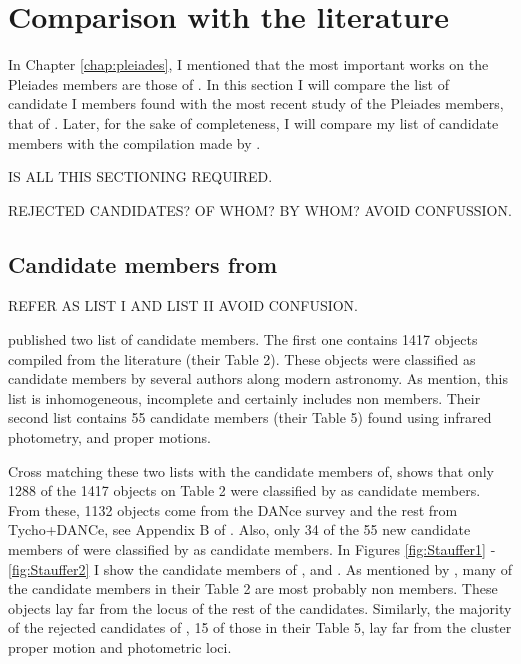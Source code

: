  
\section{Comparison with the literature}
\label{sect:memberscomparison}
In Chapter \ref{chap:pleiades}, I mentioned that the most important works on the Pleiades members are those of \citet{Stauffer2007,Lodieu2012,Sarro2014,Bouy2015}. In this section I will compare the list of candidate I members found with the most recent study of the Pleiades members, that of \citet{Bouy2015}. Later, for the sake of completeness, I will compare my list of candidate members with the compilation made by \citet{Stauffer2007}.  

IS ALL THIS SECTIONING REQUIRED.

REJECTED CANDIDATES? OF WHOM? BY WHOM? AVOID CONFUSSION.

\subsection{Candidate members from \citet{Stauffer2007}}

REFER AS LIST I AND LIST II AVOID CONFUSION.

\citet{Stauffer2007} published two list of candidate members. The first one contains 1417 objects compiled from the literature (their Table 2). These objects were classified as candidate members by several authors along modern astronomy. As \citet{Stauffer2007} mention, this list is inhomogeneous, incomplete and certainly includes non members. Their second list contains 55 candidate members  (their Table 5) found using infrared photometry, and proper motions.

Cross matching these two lists with the candidate members of\citet{Bouy2015}, shows that only 1288 of the 1417 objects on \citet{Stauffer2007} Table 2 were classified by \citet{Bouy2015} as candidate members. From these, 1132 objects come from the DANce survey and the rest from Tycho+DANCe, see Appendix B of \citet{Bouy2015}. Also, only 34 of the 55 new candidate members of  \citet{Stauffer2007} were classified by \citet{Bouy2015} as candidate members. In Figures \ref{fig:Stauffer1} - \ref{fig:Stauffer2} I show the candidate members of \citet{Stauffer2007}, and \citet{Bouy2015}. As mentioned by \citet{Stauffer2007}, many of the candidate members in their Table 2 are most probably non members. These objects lay far from the locus of the rest of the candidates. Similarly, the majority of the rejected candidates of \citet{Stauffer2007}, 15 of those in their Table 5, lay far from the cluster proper motion and photometric loci.


